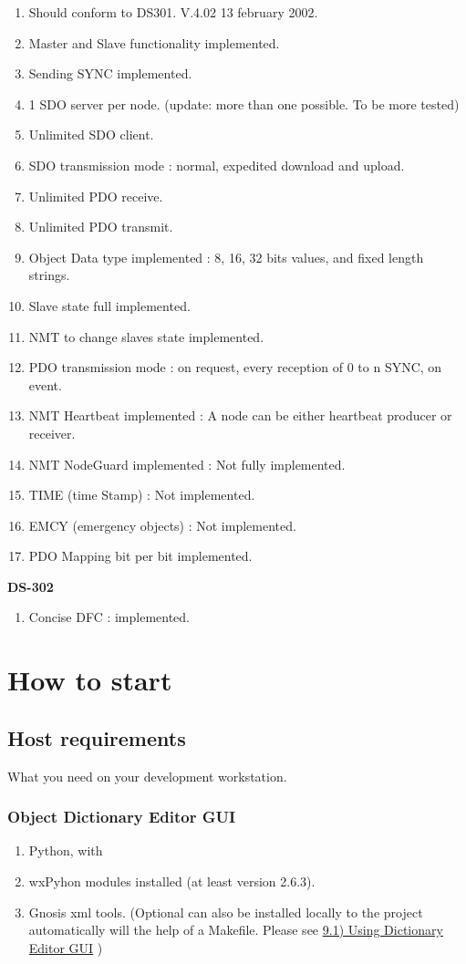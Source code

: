 \documentclass[a4paper,12pt]{book}
\newcommand\liststyleLiv{%
\renewcommand\labelitemi{{--}}
\renewcommand\labelitemii{{--}}
\renewcommand\labelitemiii{{--}}
\renewcommand\labelitemiv{{--}}
}
\newcommand\liststyleLv{%
\renewcommand\labelitemi{{--}}
\renewcommand\labelitemii{{--}}
\renewcommand\labelitemiii{{--}}
\renewcommand\labelitemiv{{--}}
}
\begin{document}
\liststyleLiv
\begin{enumerate}
\item Should conform to DS301. V.4.02 13 february 2002.
\item Master and Slave functionality implemented.
\item Sending SYNC implemented.
\item 1 SDO server per node. (update: more than one possible. To be more
tested)
\item Unlimited SDO client.
\item SDO transmission mode : normal, expedited download and upload.
\item Unlimited PDO receive.
\item Unlimited PDO transmit.
\item Object Data type implemented : 8, 16, 32 bits values, and fixed
length strings.
\item Slave state full implemented.
\item NMT to change slave{\textquotesingle}s state implemented.
\item PDO transmission mode : on request, every reception of 0 to n
SYNC, on event.
\item NMT Heartbeat implemented : A node can be either heartbeat
producer or receiver.
\item NMT NodeGuard implemented : Not fully implemented.
\item TIME (time Stamp) : Not implemented.
\item EMCY (emergency objects) : Not implemented.
\item PDO Mapping bit per bit implemented.
\end{enumerate}
{\bfseries\upshape
DS{}-302}

\liststyleLiv
\begin{enumerate}
\item Concise \space DFC : implemented.
\end{enumerate}
\section{How to start}
\subsection{Host requirements}
What you need on your development workstation.

\subsubsection{Object Dictionary Editor GUI}
\liststyleLv
\begin{enumerate}
\item Python, with 
\item wxPyhon modules installed (at least version 2.6.3). 
\item Gnosis xml tools. (Optional can also be installed locally to the
project automatically will the help of a Makefile. Please see
\hyperlink{a91UsingDictionaryEditorGUIoutline}{9.1) Using Dictionary
Editor GUI} )
\end{enumerate}
\end{document}
